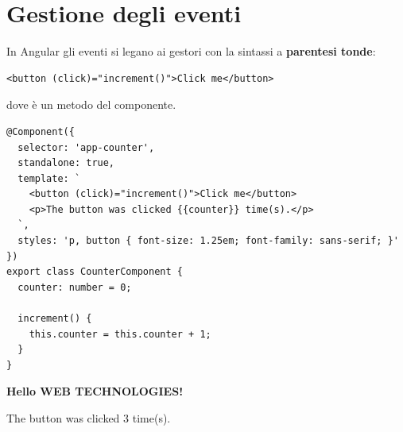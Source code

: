\section{Gestione degli eventi}

In Angular gli eventi si legano ai gestori con la sintassi a \textbf{parentesi
tonde}:

\begin{lstlisting}[style=html]
<button (click)="increment()">Click me</button>
\end{lstlisting}

dove  è un metodo del componente.

\begin{affianco}[0.54][c]
\codicepiccolo
\begin{lstlisting}[style=ts, name=counter.component.ts]
@Component({
  selector: 'app-counter',
  standalone: true,
  template: `
    <button (click)="increment()">Click me</button>
    <p>The button was clicked {{counter}} time(s).</p>
  `,
  styles: 'p, button { font-size: 1.25em; font-family: sans-serif; }'
})
export class CounterComponent {
  counter: number = 0;

  increment() {
    this.counter = this.counter + 1;
  }
}
\end{lstlisting}
\risultato
\begin{browser}[AngularApp]
  {\Lato\bfseries\Large\color{css-darkblue} Hello WEB TECHNOLOGIES!\par}\vspace{6pt}
  \par\vspace{6pt}
  {\Lato\large The button was clicked 3 time(s).\par}
\end{browser}
\begin{immagine}
\end{immagine}
\end{affianco}

